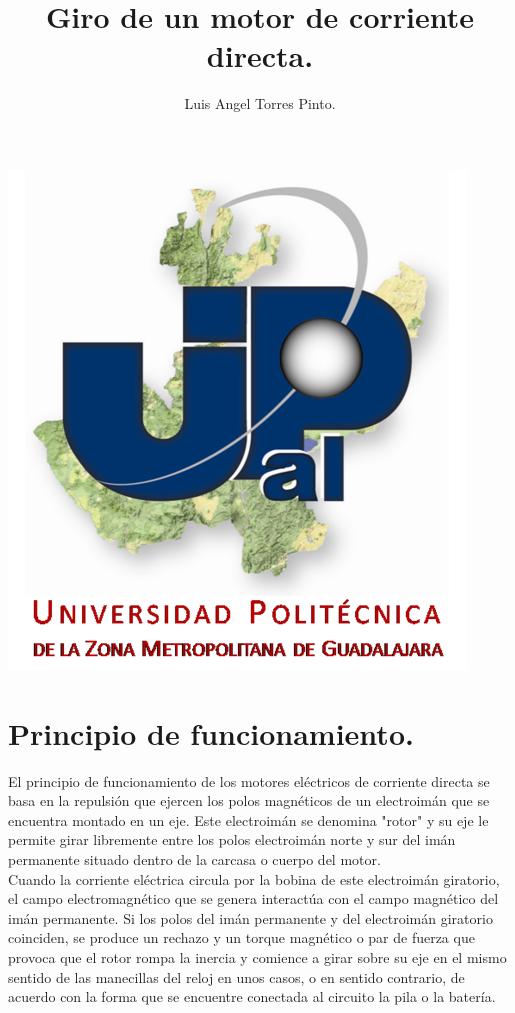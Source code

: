 \documentclass[10pt,a4paper]{article}
\title{Giro de un motor de corriente directa.}
\author{Luis Angel Torres Pinto. }\\
\begin{document}
\maketitle
\centering
\includegraphics[scale=2.10]{upzmg.jpg}\\
\raggedright
\newpage
\section{Principio de funcionamiento.}
El principio de funcionamiento de los motores eléctricos de corriente directa se basa en la repulsión que ejercen los polos magnéticos de un electroimán que se encuentra montado en un eje. Este electroimán se denomina "rotor" y su eje le permite girar libremente entre los polos electroimán norte y sur del imán permanente situado dentro de la carcasa o cuerpo del motor.\\
Cuando la corriente eléctrica circula por la bobina de este electroimán giratorio, el campo electromagnético que se genera interactúa con el campo magnético del imán permanente. Si los polos del imán permanente y del electroimán giratorio coinciden, se produce un rechazo y un torque magnético o par de fuerza que provoca que el rotor rompa la inercia y comience a girar sobre su eje en el mismo sentido de las manecillas del reloj en unos casos, o en sentido contrario, de acuerdo con la forma que se encuentre conectada al circuito la pila o la batería.
\end{document}
